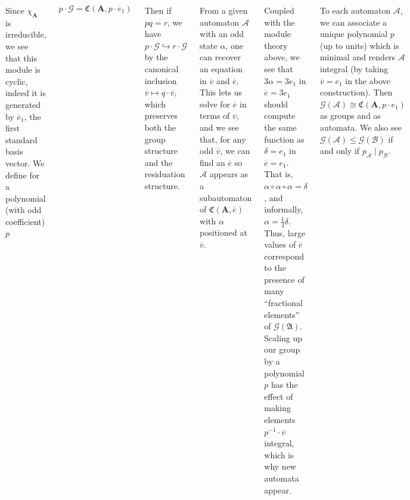 \documentclass[24pt]{tikzposter}
\theoremstyle{definition}
\begin{document}
\begin{columns}
{    \bigskip

    Since $\chi_\mathbf{A}$ is irreducible, we see that this module is cyclic,
    indeed it is generated by $\overline{e}_1$, the first standard basis vector. 
    We define for a polynomial (with odd coefficient) $p$

    \[ p \cdot \mathcal{G} = \mathfrak{C}(\mathbf{A}, p \cdot \overline{e}_1) \]

    Then if $pq = r$, we have 
    $p \cdot \mathcal{G} \hookrightarrow r \cdot \mathcal{G}$ by the
    canonical inclusion $\overline{v} \mapsto q \cdot \overline{v}$, which
    preserves both the group structure and the residuation structure.

    \bigskip

  }

  {
    From a given automaton $\mathcal{A}$ with an odd state $\alpha$, 
    one can recover an equation in $\overline{v}$ and $\overline{e}$. 
    This lets us solve for $\overline{e}$ in terms of $\overline{v}$, 
    and we see that, for any odd $\overline{v}$, we can find an $\overline{e}$
    so $\mathcal{A}$ appears as a subautomaton of 
    $\mathfrak{C}(\mathbf{A},\overline{e})$ with $\alpha$ positioned at 
    $\overline{v}$.

    \bigskip

    Coupled with the module theory above, we see that 
    $3 \alpha = 3 e_1$ in $\overline{e} = 3 e_1$ should 
    compute the same function as $\delta = e_1$ in $\overline{e} = e_1$. 
    That is, $\alpha \circ \alpha \circ \alpha = \delta$, and informally,
    $\alpha = \frac{1}{3}\delta$. Thus, large values of $\overline{e}$ 
    correspond to the presence of many ``fractional elements'' of 
    $\mathcal{G}(\mathfrak{A})$. Scaling up our group by a polynomial $p$ has 
    the effect of making elements $p^{-1} \cdot \overline{v}$ integral, which
    is why new automata appear. 

    \bigskip

    To each automaton $\mathcal{A}$, we can associate a unique polynomial $p$
    (up to units) which is minimal and renders $\mathcal{A}$ integral
    (by taking $\overline{v} = e_1$ in the above construction). Then 
    $\mathcal{G}(\mathcal{A}) \cong \mathfrak{C}(\mathbf{A},p \cdot e_1)$
    as groups and as automata.
    We also see $\mathcal{G}(\mathcal{A}) \leq \mathcal{G}(\mathcal{B})$ 
    if and only if $p_\mathcal{A} \mid p_\mathcal{B}$.

    \bigskip

}
\end{columns}
\end{document}

